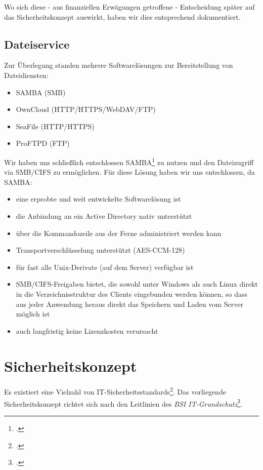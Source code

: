 Wo sich diese - aus finanziellen Erwägungen getroffene - Entscheidung später auf das Sicherheitskonzept auswirkt, haben wir dies entsprechend dokumentiert.

\subsection{Dateiservice}
Zur Überlegung standen mehrere Softwarelösungen zur Bereitstellung von Dateidiensten:

\begin{itemize}
\item SAMBA (SMB)
\item OwnCloud (HTTP/HTTPS/WebDAV/FTP)
\item SeaFile (HTTP/HTTPS)
\item ProFTPD (FTP)
\end{itemize}
Wir haben uns schließlich entschlossen SAMBA\footcite{samba} zu nutzen und den Dateizugriff via SMB/CIFS zu ermöglichen. Für diese Lösung haben wir uns entschlossen, da SAMBA:

\begin{itemize}
\item eine erprobte und weit entwickelte Softwarelösung ist
\item die Anbindung an ein Active Directory nativ unterstützt
\item über die Kommandozeile aus der Ferne administriert werden kann
\item Transportverschlüsselung unterstützt (AES-CCM-128)
\item für fast alle Unix-Derivate (auf dem Server) verfügbar ist
\item SMB/CIFS-Freigaben bietet, die sowohl unter Windows als auch Linux direkt in die Verzeichnisstruktur des Clients eingebunden werden können, so dass aus jeder Anwendung heraus direkt das Speichern und Laden vom Server möglich ist
\item auch langfristig keine Lizenzkosten verursacht
\end{itemize}

\newpage
\section{Sicherheitskonzept}
\label{sec:sicherheitskonzept}
Es existiert eine Vielzahl von IT-Sicherheitsstandards\footcite{wikiCyberSecStandards}. Das vorliegende Sicherheitskonzept richtet sich nach den Leitlinien des \emph{BSI IT-Grundschutz}\footcite{grundschutz}.\\

